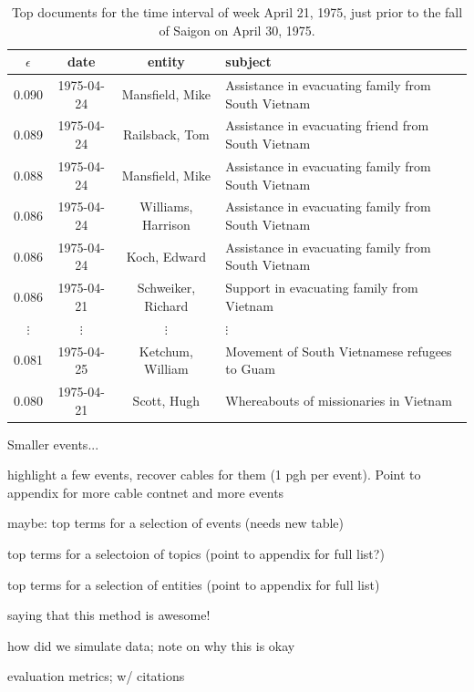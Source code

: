 \begin{table}[htb]
\small
\centering
\begin{tabular}{cccl}
\toprule
$\epsilon$ & date & entity & subject \\
\midrule
0.090   &  1975-04-24  &  Mansfield, Mike & Assistance in evacuating family from South Vietnam \\
0.089   &  1975-04-24  &  Railsback, Tom & Assistance in evacuating friend from South Vietnam \\
0.088   &  1975-04-24  &  Mansfield, Mike  & Assistance in evacuating family from South Vietnam \\
0.086   &  1975-04-24  &  Williams, Harrison &  Assistance in evacuating family from South Vietnam \\
0.086   &  1975-04-24  &  Koch, Edward & Assistance in evacuating family from South Vietnam \\
0.086   &  1975-04-21  &  Schweiker, Richard & Support in evacuating family from Vietnam \\
$\vdots$ & $\vdots$ & $\vdots$ & $\vdots$ \\
0.081   &  1975-04-25  &  Ketchum, William & Movement of South Vietnamese refugees to Guam \\
0.080   &  1975-04-21  &  Scott, Hugh & Whereabouts of missionaries in Vietnam \\
\bottomrule
\end{tabular}
\label{tab:saigon}
\caption{Top documents for the time interval of week April 21, 1975, just prior to the fall of Saigon on April 30, 1975.}
\end{table}

Smaller events...


\PP highlight a few events, recover cables for them (1 pgh per event).  Point to appendix for more cable contnet and more events

\PP maybe: top terms for a selection of events (needs new table)

\PP top terms for a selectoion of topics (point to appendix for full list?)

\PP top terms for a selection of entities (point to appendix for full list)

\PP saying that this method is awesome!

\PP how did we simulate data; note on why this is okay

\PP evaluation metrics; w/ citations

